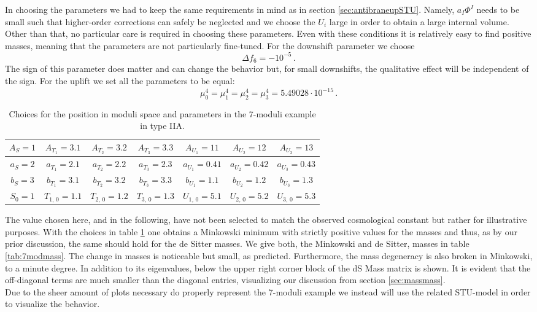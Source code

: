 \documentclass[12pt]{report}
\newcommand{\be}{\begin{equation}}
\newcommand{\ee}{\end{equation}}
\begin{document}
In choosing the parameters we had to keep the same requirements in mind as in section \ref{sec:antibraneupSTU}.  Namely, $a_I \Phi^I$ needs to be small such that higher-order corrections can safely be neglected and we choose the $U_i$ large in order to obtain a large internal volume. Other than that, no particular care is required in choosing these parameters. Even with these conditions it is relatively easy to find positive masses, meaning that the parameters are not particularly fine-tuned. For the downshift parameter we choose 
\be 
\Delta f_6 = -10^{-5}\,.
\ee 
The sign of this parameter does matter and can change the behavior but, for small downshifts, the qualitative effect will be independent of the sign. For the uplift we set all the parameters to be equal:
\be 
\mu_0 ^4 = \mu_1 ^4 = \mu_2 ^4 = \mu_3 ^4 = 5.49028 \cdot 10^{-15}\,.
\ee
\begin{table}[H]
\centering
\begin{tabular}{|c|c|c|c|c|c|c|}\hline
$A_S = 1$ & $A_{T_1} = 3.1$& $A_{T_2} = 3.2$& $A_{T_3} = 3.3$ & $A_{U_1} =11$& $A_{U_2} =12$& $A_{U_3} =13$\\\hline
$a_S = 2$ & $a_{T_1} = 2.1$& $a_{T_2} = 2.2$& $a_{T_3} = 2.3$ & $a_{U_1} =0.41$& $a_{U_2} =0.42$& $a_{U_3} =0.43$\\\hline
$b_S = 3$ & $b_{T_1} = 3.1$& $b_{T_2} = 3.2$& $b_{T_3} = 3.3$ & $b_{U_1} =1.1$& $b_{U_2} =1.2$& $b_{U_3} =1.3$\\\hline
$S_0 = 1$ & $T_{1,\,0} = 1.1$  & $T_{2,\,0} = 1.2$  & $T_{3,\,0} = 1.3$ & $U_{1,\,0} = 5.1$& $U_{2,\,0} = 5.2$& $U_{3,\,0} = 5.3$\\\hline
\end{tabular}
\caption{Choices for the position in moduli space and parameters in the 7-moduli example in type IIA.}
\label{tab:7modchoice}
\end{table}
The value chosen here, and in the following, have not been selected to match the observed cosmological constant but rather for illustrative purposes. With the choices in table \ref{tab:7modchoice} one obtains a Minkowski minimum with strictly positive values for the masses and thus, as by our prior discussion, the same should hold for the de Sitter masses. We give both, the Minkowski and de Sitter, masses in table \ref{tab:7modmass}. The change in masses is noticeable but small, as predicted. Furthermore, the mass degeneracy is also broken in Minkowski, to a minute degree. In addition to its eigenvalues, below the upper right corner block of the dS Mass matrix is shown. It is evident that the off-diagonal terms are much smaller than the diagonal entries, visualizing our discussion from section \ref{sec:massmass}.\\
Due to the sheer amount of plots necessary do properly represent the 7-moduli example we instead will use the related STU-model in order  to visualize the behavior.
\end{document}
